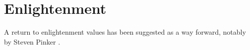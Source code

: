 \documentclass[10pt,titlepage]{book}
\begin{document}
\section{Enlightenment}

A return to enlightenment values has been suggested as a way forward, notably by Steven Pinker \cite{pinker-en}.


{}








\end{document}
